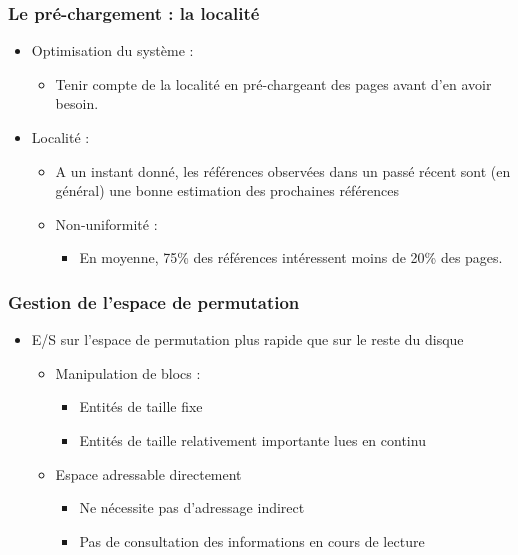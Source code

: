 \begin{frame}
\frametitle{Le pré-chargement : la localité}
\begin{itemize}
\item Optimisation du système :
\begin{itemize}
\item Tenir compte de la localité en pré-chargeant des pages avant d'en avoir besoin.
\end{itemize}
\item Localité :
\begin{itemize}
\item A un instant donné, les références observées dans un passé récent sont (en général) une bonne estimation des prochaines références
\item Non-uniformité :
\begin{itemize}
\item En moyenne, 75\% des références intéressent moins de 20\% des pages.
\end{itemize}
\end{itemize}
\end{itemize}
\end{frame}


\begin{frame}
\frametitle{Gestion de l'espace de permutation}
\begin{itemize}
\item E/S sur l'espace de permutation plus rapide que sur le reste du disque
\begin{itemize}
\item Manipulation de blocs :
\begin{itemize}
\item Entités de taille fixe
\item Entités de taille relativement importante lues en continu
\end{itemize}
\item Espace adressable directement
\begin{itemize}
\item Ne nécessite pas d'adressage indirect
\item Pas de consultation des informations en cours de lecture
\end{itemize}
\end{itemize}
\end{itemize}
\end{frame}



